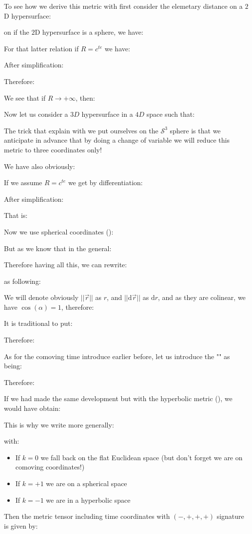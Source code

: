 	To see how we derive this metric with first consider the elemetary distance on a $2$D hypersurface:
	
	on if the $2$D hypersurface is a sphere, we have:
	
	For that latter relation if $R=c^{te}$ we have:
	
	After simplification:
	
	Therefore:
	
	We see that if $R\rightarrow +\infty$, then:
	
	Now let us consider a $3D$ hypersurface in a $4D$ space such that:
	
	The trick that explain with we put ourselves on the $\mathcal{S}^3$ sphere is that we anticipate in advance that by doing a change of variable we will reduce this metric to three coordinates only!
	
	We have also obviously:
	
	If we assume $R=c^{te}$ we get by differentiation:
	
	After simplification:
	
	That is:
	
	Now we use spherical coordinates ():
	
	But as we know that in the general:
	
	Therefore having all this, we can rewrite:
	
	as following:
	
	We will denote obviously $||\vec{r}||$ as $r$, and $||\mathrm{d}\vec{r}||$ as $\mathrm{d}r$, and as they are colinear, we have $\cos(\alpha)=1$, therefore:
	
	It is traditional to put:
	
	Therefore:
	
	As for the comoving time introduce earlier before, let us introduce the "" as being:
	
	Therefore:
	
	If we had made the same development but with the hyperbolic metric (), we would have obtain:
	
	This is why we write more generally:
	
	with:
	\begin{itemize}
		\item If $k=0$ we fall back on the flat Euclidean space (but don't forget we are on comoving coordinates!)
		
		\item If $k=+1$ we are on a spherical space
		
		\item If $k=-1$ we are in a hyperbolic space
	\end{itemize}
	Then the metric tensor including time coordinates with $(-,+,+,+)$ signature is given by:
	
